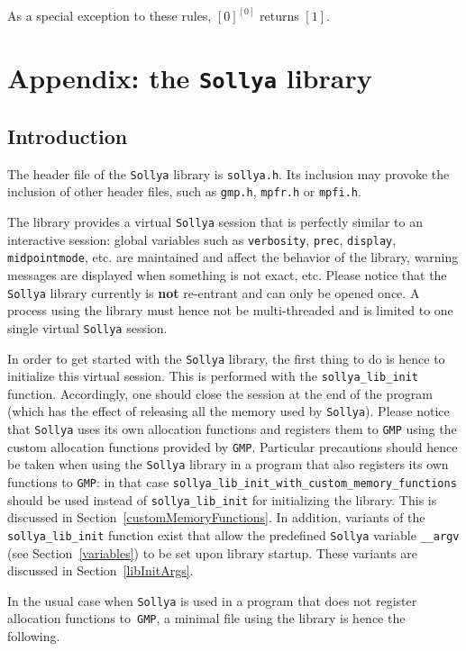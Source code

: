 \documentclass[a4paper]{article}
\newcommand{\sollya}{\texttt{Sollya}\xspace}
\begin{document}
As a special exception to these rules, $[0]^{[0]}$ returns $[1]$.

\newpage
\section{Appendix: the \sollya library}
\label{Libsollya}
 \subsection{Introduction}
The header file of the \sollya library is \texttt{sollya.h}. Its inclusion may provoke the inclusion of other header files, such as \texttt{gmp.h}, \texttt{mpfr.h} or \texttt{mpfi.h}.

The library provides a virtual \sollya session that is perfectly similar to an interactive session: global variables such as \texttt{verbosity}, \texttt{prec}, \texttt{display}, \texttt{midpointmode}, etc. are maintained and affect the behavior of the library, warning messages are displayed when something is not exact, etc. Please notice that the \sollya library currently is \textbf{not} re-entrant and can only be opened once. A process using the library must hence not be multi-threaded and is limited to one single virtual \sollya session.

In order to get started with the \sollya library, the first thing to do is hence to initialize this virtual session. This is performed with the \verb|sollya_lib_init| function. Accordingly, one should close the session at the end of the program (which has the effect of releasing all the memory used by \sollya). Please notice that \sollya uses its own allocation functions and registers them to \verb|GMP| using the custom allocation functions provided by \verb|GMP|. Particular precautions should hence be taken when using the \sollya library in a program that also registers its own functions to \verb|GMP|: in that case \verb|sollya_lib_init_with_custom_memory_functions| should be used instead of \verb|sollya_lib_init| for initializing the library. This is discussed in Section~\ref{customMemoryFunctions}. In addition, variants of the \verb|sollya_lib_init| function exist that allow the predefined \sollya variable \verb|__argv| (see Section~\ref{variables}) to be set upon library startup. These variants are discussed in Section~\ref{libInitArgs}.


In the usual case when \sollya is used in a program that does not register allocation functions to~\verb|GMP|, a minimal file using the library is hence the following.
\end{document}
